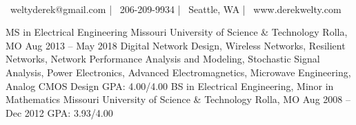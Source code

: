 \documentclass[]{awesome-cv}
\begin{document}
    
\begin{center}
	  \\
	\vspace{2mm}
	{\faEnvelope\ weltyderek@gmail.com} | {\faMobile\ 206-209-9934} | {\faMapMarker\ Seattle, WA} | {\faGlobe\ www.derekwelty.com}
\end{center}
\begin{cventries}
	\cventry
	{MS in Electrical Engineering}
	{Missouri University of Science \& Technology}
	{Rolla, MO}
	{Aug 2013 – May 2018}
	{Digital Network Design, Wireless Networks, Resilient Networks, Network Performance Analysis and Modeling, \newline Stochastic Signal Analysis, Power Electronics, Advanced Electromagnetics, Microwave Engineering, Analog CMOS Design
	\newline
	GPA: 4.00/4.00}
	\cventry
	{BS in Electrical Engineering, Minor in Mathematics}
	{Missouri University of Science \& Technology}
	{Rolla, MO}
	{Aug 2008 – Dec 2012}
	{GPA: 3.93/4.00}
\end{cventries}
\end{document}
